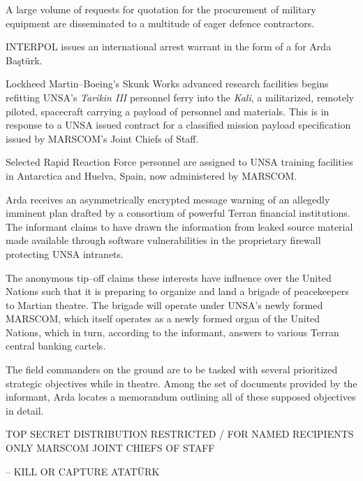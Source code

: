 A large volume of requests for quotation for the procurement of military equipment are disseminated to a multitude of eager defence contractors.
\StopTimelineDate

INTERPOL issues an international arrest warrant in the form of a  for Arda Baştürk.
\StopTimelineDate

Lockheed Martin--Boeing's Skunk Works advanced research facilities begins refitting UNSA's {\it Tarikin III} personnel ferry into the {\it Kali}, a militarized, remotely piloted, spacecraft carrying a payload of personnel and materials. This is in response to a UNSA issued contract for a classified mission payload specification issued by MARSCOM's Joint Chiefs of Staff.
\StopTimelineDate

Selected Rapid Reaction Force personnel are assigned to UNSA training facilities in Antarctica and Huelva, Spain, now administered by MARSCOM.
\StopTimelineDate

Arda receives an asymmetrically encrypted message warning of an allegedly imminent plan drafted by a consortium of powerful Terran financial institutions. The informant claims to have drawn the information from leaked source material made available through software vulnerabilities in the proprietary firewall protecting UNSA intranets. 

The anonymous tip--off claims these interests have influence over the United Nations such that it is preparing to organize and land a brigade of peacekeepers to Martian theatre. The brigade will operate under UNSA's newly formed MARSCOM, which itself operates as a newly formed organ of the United Nations, which in turn, according to the informant, answers to various Terran central banking cartels.

The field commanders on the ground are to be tasked with several prioritized strategic objectives while in theatre. Among the set of documents provided by the informant, Arda locates a memorandum outlining all of these supposed objectives in detail.

\startTimelineCorrespondenceDocument
TOP SECRET
DISTRIBUTION RESTRICTED / FOR NAMED RECIPIENTS ONLY
MARSCOM JOINT CHIEFS OF STAFF
\startitemize[4]
\item {} -- KILL OR CAPTURE ATATÜRK

